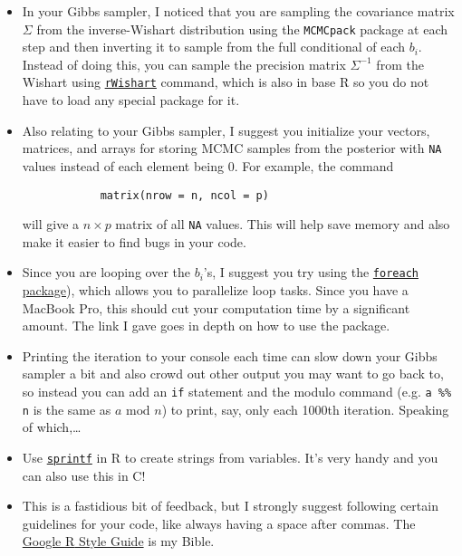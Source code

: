 \documentclass[11pt]{article}
\begin{document}
\begin{itemize}
	\item 
	In your Gibbs sampler, I noticed that you are sampling the covariance matrix $\Sigma$ from the inverse-Wishart distribution using the \texttt{MCMCpack} package at each step and then inverting it to sample from the full conditional of each $b_i$. Instead of doing this, you can sample the precision matrix $\Sigma^{-1}$ from the Wishart using \href{https://stat.ethz.ch/R-manual/R-devel/library/stats/html/rWishart.html}{\texttt{rWishart}} command, which is also in base \textsf{R} so you do not have to load any special package for it.
	\item
	Also relating to your Gibbs sampler, I suggest you initialize your vectors, matrices, and arrays for storing MCMC samples from the posterior with \texttt{NA} values instead of each element being 0. For example, the command \begin{verbatim}
			matrix(nrow = n, ncol = p)
	\end{verbatim} will give a $n \times p$ matrix of all \texttt{NA} values. This will help save memory and also make it easier to find bugs in your code.
	\item
	Since you are looping over the $b_i$'s, I suggest you try using the \href{https://cran.r-project.org/web/packages/foreach/vignettes/foreach.pdf}{\texttt{foreach} package}), which allows you to parallelize loop tasks. Since you have a MacBook Pro, this should cut your computation time by a significant amount. The link I gave goes in depth on how to use the package.
	\item
	Printing the iteration to your console each time can slow down your Gibbs sampler a bit and also crowd out other output you may want to go back to, so instead you can add an \texttt{if} statement and the modulo command (e.g. \texttt{a \%\% n} is the same as $a \text{ mod } n$) to print, say, only each 1000th iteration. Speaking of which,\ldots
	\item
	Use \href{http://www.cookbook-r.com/Strings/Creating_strings_from_variables/}{\texttt{sprintf}} in \textsf{R} to create strings from variables. It's very handy and you can also use this in \textsf{C}! 
	\item 
	This is a fastidious bit of feedback, but I strongly suggest following certain guidelines for your code, like always having a space after commas. The \href{https://google.github.io/styleguide/Rguide.xml}{Google \textsf{R} Style Guide} is my Bible.
\end{itemize}
\end{document}
